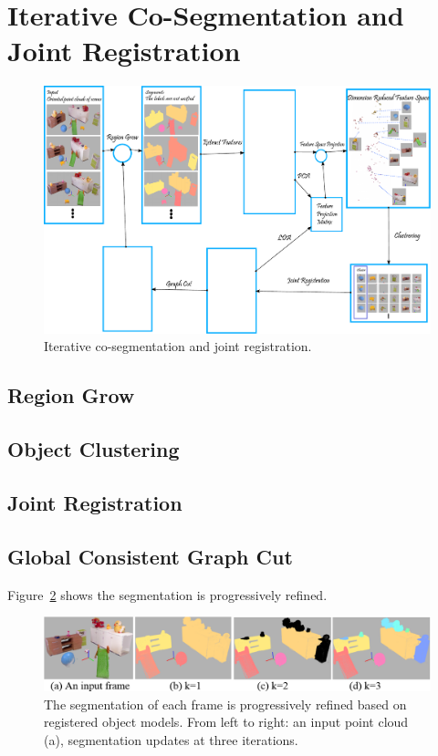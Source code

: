 \section{Iterative Co-Segmentation and Joint Registration}
\label{sec:segmentation}
\begin{figure}
	\includegraphics[width=1.0\textwidth]{figures/hsy/overview}
	\caption{Iterative co-segmentation and joint registration.}
	\label{fig:iterative-segmentation-registration}
\end{figure}
\subsection{Region Grow}
\subsection{Object Clustering}
\subsection{Joint Registration}
\subsection{Global Consistent Graph Cut}
Figure~\ref{fig:object-iterations} shows the segmentation is progressively refined. 

\begin{figure}
\centering
\includegraphics[width=2\columnwidth]{figures/object-iterations.png}
\caption{ The segmentation of each frame is progressively refined based on registered object models. From left to right: an input point cloud (a), segmentation updates at three iterations.  	 }
\label{fig:object-iterations}
\end{figure}
